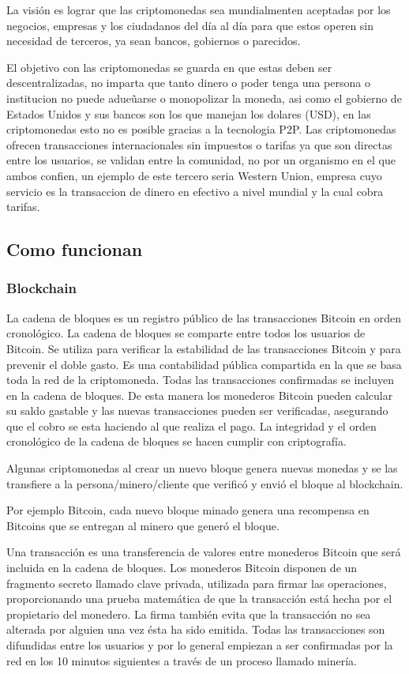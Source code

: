 \documentclass[12pt,letterpaper]{article}
\begin{document}
	La visi\'on es lograr que las criptomonedas sea mundialmenten aceptadas por los negocios, empresas y los ciudadanos del d\'ia al d\'ia para que estos operen sin necesidad de terceros, ya sean bancos, gobiernos o parecidos. 	
	
	El objetivo con las criptomonedas se guarda en que estas deben ser descentralizadas, no imparta que tanto dinero o poder tenga una persona o institucion no puede adue\~uarse o monopolizar la moneda, asi como el gobierno de Estados Unidos y sus bancos son los que manejan los dolares (USD), en las criptomonedas esto no es posible gracias a la tecnologia P2P. 
	Las criptomonedas ofrecen transacciones internacionales sin impuestos o tarifas ya que son directas entre los usuarios, se validan entre la comunidad, no por un organismo en el que ambos confien, un ejemplo de este tercero seria Western Union, empresa cuyo servicio es la transaccion de dinero en efectivo a nivel mundial y la cual cobra tarifas.
	\subsection*{Como funcionan}
	
		\subsubsection*{Blockchain}
		La cadena de bloques es un registro p\'ublico de las transacciones Bitcoin en orden cronol\'ogico. La cadena de bloques se comparte entre todos los usuarios de Bitcoin. Se utiliza para verificar la estabilidad de las transacciones Bitcoin y para prevenir el doble gasto. Es una contabilidad p\'ublica compartida en la que se basa toda la red de la criptomoneda. Todas las transacciones confirmadas se incluyen en la cadena de bloques. De esta manera los monederos Bitcoin pueden calcular su saldo gastable y las nuevas transacciones pueden ser verificadas, asegurando que el cobro se esta haciendo al que realiza el pago. La integridad y el orden cronol\'ogico de la cadena de bloques se hacen cumplir con criptograf\'ia.
		
		Algunas criptomonedas al crear un nuevo bloque genera nuevas monedas y se las transfiere a la persona/minero/cliente que verific\'o y envi\'o el bloque al blockchain.

Por ejemplo Bitcoin, cada nuevo bloque minado genera una recompensa en Bitcoins que se entregan al minero que gener\'o el bloque.

Una transacci\'on es una transferencia de valores entre monederos Bitcoin que ser\'a incluida en la cadena de bloques. Los monederos Bitcoin disponen de un fragmento secreto llamado clave privada, utilizada para firmar las operaciones, proporcionando una prueba matem\'atica de que la transacci\'on est\'a hecha por el propietario del monedero. La firma tambi\'en evita que la transacci\'on no sea alterada por alguien una vez \'esta ha sido emitida. Todas las transacciones son difundidas entre los usuarios y por lo general empiezan a ser confirmadas por la red en los 10 minutos siguientes a trav\'es de un proceso llamado miner\'ia.
\end{document}
